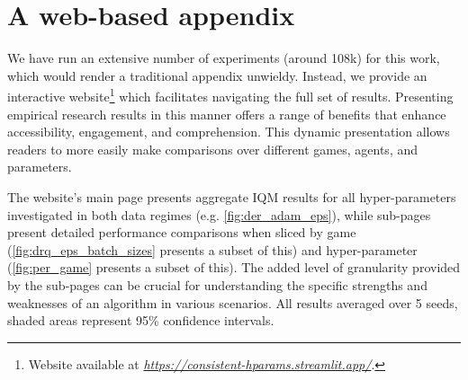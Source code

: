\documentclass[10pt]{article} %
\begin{document}
\section{A web-based appendix} 
\label{web_results}
We have run an extensive number of experiments (around 108k) for this work, which would render a traditional appendix unwieldy. Instead, we provide an interactive website\footnote{Website available at \href{https://consistent-hyperparameters.streamlit.app/}{\emph{https://consistent-hparams.streamlit.app/}}.} which facilitates navigating the full set of results. Presenting empirical research results in this manner offers a range of benefits that enhance accessibility, engagement, and comprehension. 
This dynamic presentation allows readers to more easily make comparisons over different games, agents, and parameters. 


The website's main page presents aggregate IQM results for all hyper-parameters investigated in both data regimes (e.g. \autoref{fig:der_adam_eps}), while sub-pages present detailed performance comparisons when sliced by game (\autoref{fig:drq_eps_batch_sizes} presents a subset of this) and hyper-parameter (\autoref{fig:per_game} presents a subset of this).
The added level of granularity provided by the sub-pages can be crucial for understanding the specific strengths and weaknesses of an algorithm in various scenarios. All results averaged over 5 seeds, shaded areas represent 95\% confidence intervals.
\end{document}
